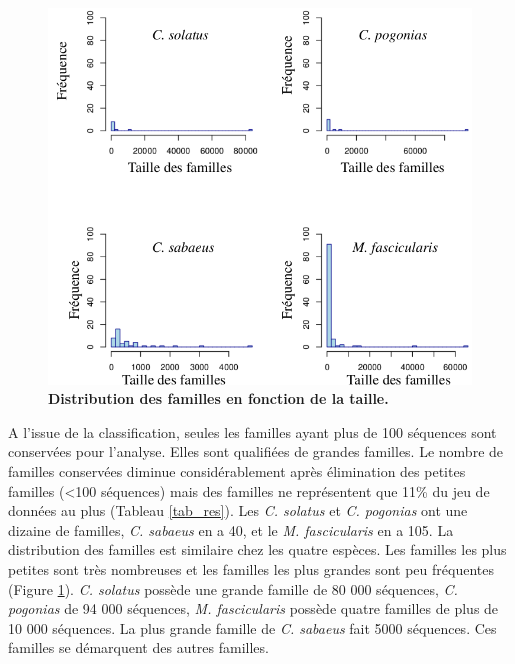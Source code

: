 \documentclass[12pt,a4paper]{article}
\begin{document}
		\begin{figure}
			\center
			\includegraphics[scale=0.45]{img/distribution_famille.png}
			\caption{\textbf{Distribution des familles en fonction de la taille.}}
			\label{dist_fam} 
		\end{figure}

	A l'issue de la classification, seules les familles ayant plus de 100 séquences sont conservées pour l'analyse. Elles sont qualifiées de grandes familles. Le nombre de familles conservées diminue considérablement après élimination des petites familles (<100 séquences) mais des familles ne représentent que 11\% du jeu de données au plus (Tableau \ref{tab_res}). Les \textit{C. solatus} et \textit{C. pogonias} ont une dizaine de familles, \textit{C. sabaeus} en a 40, et le \textit{M. fascicularis} en a 105. La distribution des familles est similaire chez les quatre espèces. Les familles les plus petites sont très nombreuses et les familles les plus grandes sont peu fréquentes (Figure \ref{dist_fam}). \textit{C. solatus} possède une grande famille de 80 000 séquences, \textit{C. pogonias} de 94 000 séquences, \textit{M. fascicularis} possède quatre familles de plus de 10 000 séquences. La plus grande famille de \textit{C. sabaeus} fait 5000 séquences. Ces familles se démarquent des autres familles.
\end{document}

